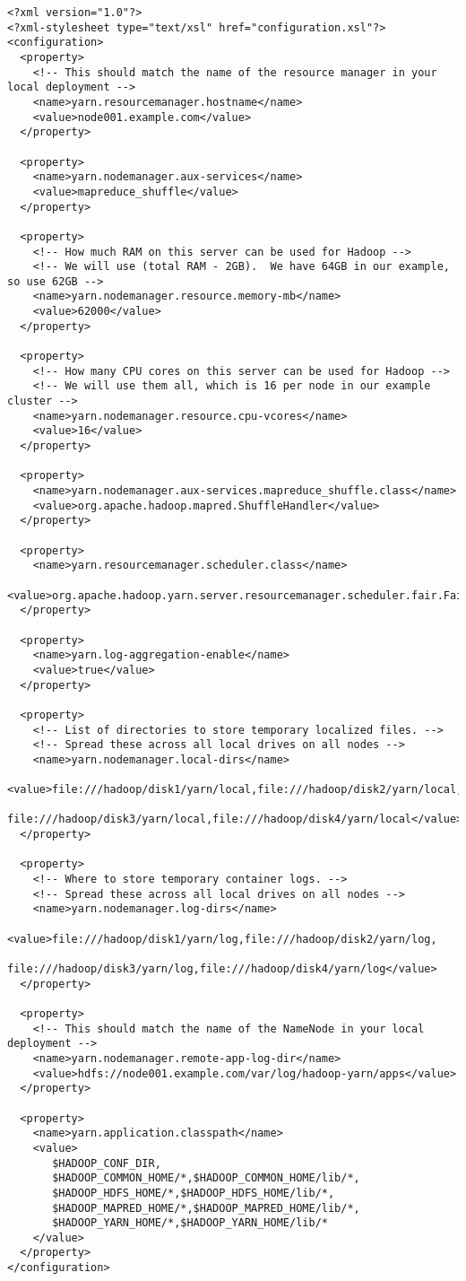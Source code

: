 \begin{verbatim}
<?xml version="1.0"?>
<?xml-stylesheet type="text/xsl" href="configuration.xsl"?>
<configuration>
  <property>
    <!-- This should match the name of the resource manager in your local deployment -->
    <name>yarn.resourcemanager.hostname</name>
    <value>node001.example.com</value>
  </property>

  <property>
    <name>yarn.nodemanager.aux-services</name>
    <value>mapreduce_shuffle</value>
  </property>

  <property>
    <!-- How much RAM on this server can be used for Hadoop -->
    <!-- We will use (total RAM - 2GB).  We have 64GB in our example, so use 62GB -->
    <name>yarn.nodemanager.resource.memory-mb</name>
    <value>62000</value>
  </property>

  <property>
    <!-- How many CPU cores on this server can be used for Hadoop -->
    <!-- We will use them all, which is 16 per node in our example cluster -->
    <name>yarn.nodemanager.resource.cpu-vcores</name>
    <value>16</value>
  </property>

  <property>
    <name>yarn.nodemanager.aux-services.mapreduce_shuffle.class</name>
    <value>org.apache.hadoop.mapred.ShuffleHandler</value>
  </property>

  <property>
    <name>yarn.resourcemanager.scheduler.class</name>
    <value>org.apache.hadoop.yarn.server.resourcemanager.scheduler.fair.FairScheduler</value>
  </property>

  <property>
    <name>yarn.log-aggregation-enable</name>
    <value>true</value>
  </property>

  <property>
    <!-- List of directories to store temporary localized files. -->
    <!-- Spread these across all local drives on all nodes -->
    <name>yarn.nodemanager.local-dirs</name>
    <value>file:///hadoop/disk1/yarn/local,file:///hadoop/disk2/yarn/local,
           file:///hadoop/disk3/yarn/local,file:///hadoop/disk4/yarn/local</value>
  </property>

  <property>
    <!-- Where to store temporary container logs. -->
    <!-- Spread these across all local drives on all nodes -->
    <name>yarn.nodemanager.log-dirs</name>
    <value>file:///hadoop/disk1/yarn/log,file:///hadoop/disk2/yarn/log,
           file:///hadoop/disk3/yarn/log,file:///hadoop/disk4/yarn/log</value>
  </property>

  <property>
    <!-- This should match the name of the NameNode in your local deployment -->
    <name>yarn.nodemanager.remote-app-log-dir</name>
    <value>hdfs://node001.example.com/var/log/hadoop-yarn/apps</value>
  </property>

  <property>
    <name>yarn.application.classpath</name>
    <value>
       $HADOOP_CONF_DIR,
       $HADOOP_COMMON_HOME/*,$HADOOP_COMMON_HOME/lib/*,
       $HADOOP_HDFS_HOME/*,$HADOOP_HDFS_HOME/lib/*,
       $HADOOP_MAPRED_HOME/*,$HADOOP_MAPRED_HOME/lib/*,
       $HADOOP_YARN_HOME/*,$HADOOP_YARN_HOME/lib/*
    </value>
  </property>
</configuration>
\end{verbatim}


